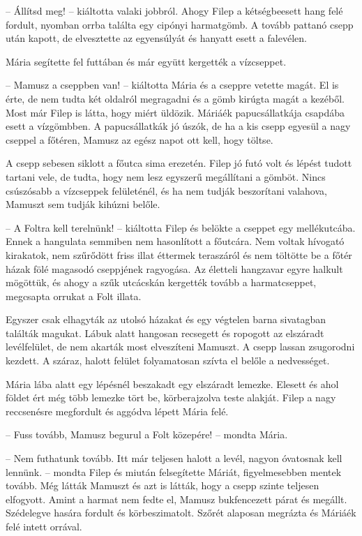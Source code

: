 \documentclass[10pt]{memoir}
\begin{document}
-- Állítsd meg! -- kiáltotta valaki jobbról. Ahogy Filep a kétségbeesett hang
felé fordult, nyomban orrba találta egy cipónyi harmatgömb. A tovább pattanó
csepp után kapott, de elvesztette az egyensúlyát és hanyatt esett a falevélen.

Mária segítette fel futtában és már együtt kergették a vízcseppet.

-- Mamusz a cseppben van! -- kiáltotta Mária és a cseppre vetette magát. El
is érte, de nem tudta két oldalról megragadni és a gömb kirúgta magát a
kezéből.  Most már Filep is látta, hogy miért üldözik. Máriáék papucsállatkája
csapdába esett a vízgömbben. A papucsállatkák jó úszók, de ha a kis csepp
egyesül a nagy cseppel a főtéren, Mamusz az egész napot ott kell, hogy töltse.

A csepp sebesen siklott a főutca sima erezetén. Filep jó futó volt és lépést
tudott tartani vele, de tudta, hogy nem lesz egyszerű megállítani a gömböt.
Nincs csúszósabb a vízcseppek felületénél, és ha nem tudják beszorítani
valahova, Mamuszt sem tudják kihúzni belőle.

-- A Foltra kell terelnünk! -- kiáltotta Filep és belökte a cseppet egy
mellékutcába. Ennek a hangulata semmiben nem hasonlított a főutcára. Nem voltak
hívogató kirakatok, nem szűrődött friss illat éttermek teraszáról és nem
töltötte be a főtér házak fölé magasodó cseppjének ragyogása. Az életteli
hangzavar egyre halkult mögöttük, és ahogy a szűk utcácskán kergették tovább a
harmatcseppet, megcsapta orrukat a Folt illata.

Egyszer csak elhagyták az utolsó házakat és egy végtelen barna sivatagban
találták magukat. Lábuk alatt hangosan recsegett és ropogott az elszáradt
levélfelület, de nem akarták most elveszíteni Mamuszt. A csepp lassan
zsugorodni kezdett. A száraz, halott felület folyamatosan szívta el belőle a
nedvességet.

Mária lába alatt egy lépésnél beszakadt egy elszáradt lemezke. Elesett és ahol
földet ért még több lemezke tört be, körberajzolva teste alakját. Filep a nagy
reccsenésre megfordult és aggódva lépett Mária felé.

-- Fuss tovább, Mamusz begurul a Folt közepére! -- mondta Mária.

-- Nem futhatunk tovább. Itt már teljesen halott a levél, nagyon óvatosnak
kell lennünk. -- mondta Filep és miután felsegítette Máriát, figyelmesebben
mentek tovább. Még látták Mamuszt és azt is látták, hogy a csepp szinte
teljesen elfogyott. Amint a harmat nem fedte el, Mamusz bukfencezett párat és
megállt.  Szédelegve hasára fordult és körbeszimatolt. Szőrét alaposan megrázta
és Máriáék felé intett orrával.
\end{document}
